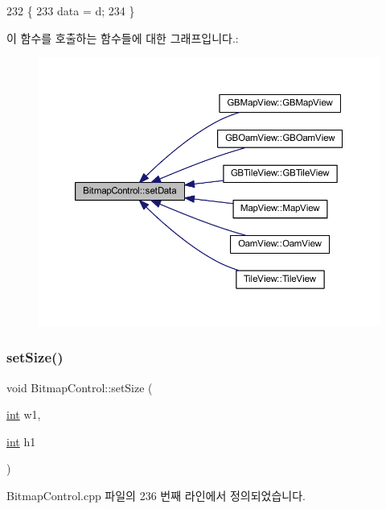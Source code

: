 \begin{DoxyCode}
232 \{
233   data = d;
234 \}
\end{DoxyCode}
이 함수를 호출하는 함수들에 대한 그래프입니다.\+:
\nopagebreak
\begin{figure}[H]
\begin{center}
\leavevmode
\includegraphics[width=350pt]{class_bitmap_control_aa6206183896caf192a37709fa5d7b8d2_icgraph}
\end{center}
\end{figure}
\mbox{\label{class_bitmap_control_a421004fe6ba01329dd69259396592d1f}} 
\subsubsection{\texorpdfstring{set\+Size()}{setSize()}}
{\footnotesize\ttfamily void Bitmap\+Control\+::set\+Size (\begin{DoxyParamCaption}\item[{\mbox{\hyperlink{_util_8cpp_a0ef32aa8672df19503a49fab2d0c8071}{int}}}]{w1,  }\item[{\mbox{\hyperlink{_util_8cpp_a0ef32aa8672df19503a49fab2d0c8071}{int}}}]{h1 }\end{DoxyParamCaption})}



Bitmap\+Control.\+cpp 파일의 236 번째 라인에서 정의되었습니다.


